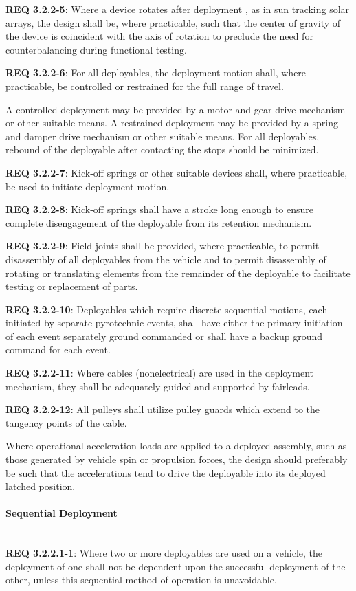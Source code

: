 \documentclass[12pt]{article}
\begin{document}
\noindent \textbf{REQ 3.2.2-5}: Where a device rotates after deployment , as in sun tracking solar arrays, the design shall be, where practicable, such that the center of gravity of the device is coincident with the axis of rotation to preclude the need for counterbalancing during functional testing. 

\noindent \textbf{REQ 3.2.2-6}: For all deployables, the deployment motion shall, where practicable, be controlled or restrained for the full range of travel. 

A controlled deployment may be provided by a motor and gear drive mechanism or other suitable means. 
A restrained deployment may be provided by a spring and damper drive mechanism or other suitable means. 
For all deployables, rebound of the deployable after contacting the stops should be minimized. 

\noindent \textbf{REQ 3.2.2-7}: Kick-off springs or other suitable devices shall, where practicable, be used to initiate deployment motion. 

\noindent \textbf{REQ 3.2.2-8}: Kick-off springs shall have a stroke long enough to ensure complete disengagement of the deployable from its retention mechanism.

\noindent \textbf{REQ 3.2.2-9}: Field joints shall be provided, where practicable, to permit disassembly of all deployables from the vehicle and to permit disassembly of rotating or translating elements from the remainder of the deployable to facilitate testing or replacement of parts. 

\noindent \textbf{REQ 3.2.2-10}: Deployables which require discrete sequential motions, each initiated by separate pyrotechnic events, shall have either the primary initiation of each event separately ground commanded or shall have a backup ground command for each event. 

\noindent \textbf{REQ 3.2.2-11}: Where cables (nonelectrical) are used in the deployment mechanism, they shall be adequately guided and supported by fairleads. 

\noindent \textbf{REQ 3.2.2-12}: All pulleys shall utilize pulley guards which extend to the tangency points of the cable. 

Where operational acceleration loads are applied to a deployed assembly, such as those generated by vehicle spin or propulsion forces, the design should preferably be such that the accelerations tend to drive the deployable into its deployed latched position.


\paragraph{Sequential Deployment} \mbox{} \\ %
\noindent \textbf{REQ 3.2.2.1-1}: Where two or more deployables are used on a vehicle, the deployment of one shall not be dependent upon the successful deployment of the other, unless this sequential method of operation is unavoidable. 
\end{document}
